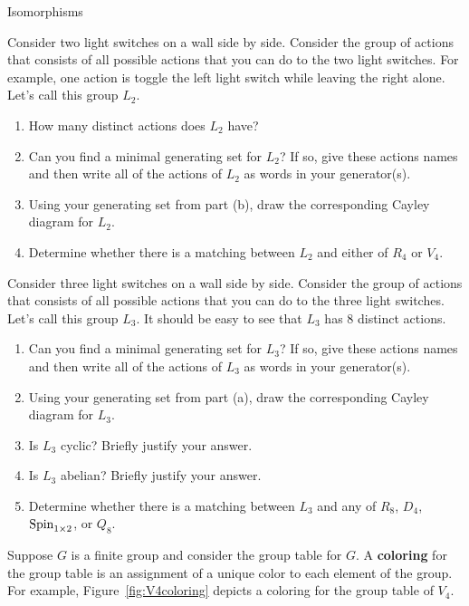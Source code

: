 \begin{section}{Isomorphisms}
\begin{problem}
Consider two light switches on a wall side by side.  Consider the group of actions that consists of all possible actions that you can do to the two light switches.  For example, one action is toggle the left light switch while leaving the right alone.  Let's call this group $L_2$.
\begin{enumerate}[label=\rm{(\alph*)}]
\item How many distinct actions does $L_2$ have?
\item Can you find a minimal generating set for $L_2$?  If so, give these actions names and then write all of the actions of $L_2$ as words in your generator(s).
\item Using your generating set from part (b), draw the corresponding Cayley diagram for $L_2$.
\item Determine whether there is a matching between $L_2$ and either of $R_4$ or $V_4$.
\end{enumerate}
\end{problem}

\begin{problem}
Consider three light switches on a wall side by side.  Consider the group of actions that consists of all possible actions that you can do to the three light switches. Let's call this group $L_3$. It should be easy to see that $L_3$ has 8 distinct actions.
\begin{enumerate}[label=\rm{(\alph*)}]
\item Can you find a minimal generating set for $L_3$?  If so, give these actions names and then write all of the actions of $L_3$ as words in your generator(s).
\item Using your generating set from part (a), draw the corresponding Cayley diagram for $L_3$.
\item Is $L_3$ cyclic? Briefly justify your answer.
\item Is $L_3$ abelian? Briefly justify your answer.
\item Determine whether there is a matching between $L_3$ and any of $R_8$, $D_4$, $\operatorname{Spin}_{1\times 2}$, or $Q_8$.
\end{enumerate}
\end{problem}

Suppose $G$ is a finite group and consider the group table for $G$.  A \textbf{coloring} for the group table is an assignment of a unique color to each element of the group.  For example, Figure~\ref{fig:V4coloring} depicts a coloring for the group table of $V_4$.


\end{section}
